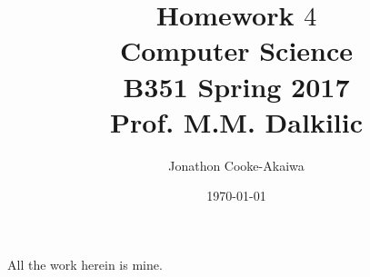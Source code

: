 \documentclass{article}
\begin{document}
\title{Homework $4$\\ Computer Science \\ B351 Spring 2017\\ Prof. M.M. Dalkilic}         %
\author{Jonathon Cooke-Akaiwa}        %
\date{\today}          %
\maketitle


\makeatother     %




\pagestyle{plain}

All the work herein is mine.
\end{document}
